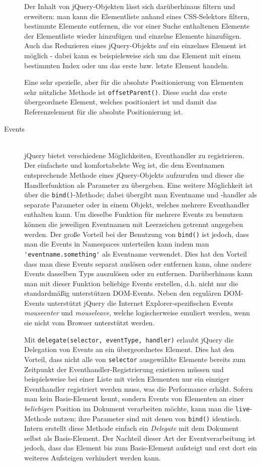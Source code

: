 \begin{description}
Der Inhalt von jQuery-Objekten lässt sich darüberhinaus filtern und erweitern: man kann die
Elementliste anhand eines CSS-Selektors filtern, bestimmte Elemente entfernen, die vor einer
Suche enthaltenen Elemente der Elementliste wieder hinzufügen und einzelne Elemente hinzufügen. Auch
das Reduzieren eines jQuery-Objekts auf ein einzelnes Element ist möglich - dabei kann es
beispielsweise sich um das Element mit einem bestimmten Index oder um das erste bzw. letzte Element
handeln.

Eine sehr spezielle, aber für die absolute Positionierung von Elementen sehr nützliche Methode ist
\lstinline{offsetParent()}. Diese sucht das erste übergeordnete Element, welches positioniert ist
und damit das Referenzelement für die absolute Positionierung ist.

\item[Events] \hfill \\
jQuery bietet verschiedene Möglichkeiten, Eventhandler zu registrieren. Der einfachste und
komfortabelste Weg ist, die dem Eventnamen entsprechende Methode eines jQuery-Objekts aufzurufen und
dieser die Handlerfunktion als Parameter zu übergeben. Eine weitere Möglichkeit ist über die
\lstinline{bind()}-Methode; dabei übergibt man Eventname und -handler als separate Parameter oder in
einem Objekt, welches mehrere Eventhandler enthalten kann. Um dieselbe Funktion für mehrere Events
zu benutzen können die jeweiligen Eventnamen mit Leerzeichen getrennt angegeben werden. Der große
Vorteil bei der Benutzung von \lstinline{bind()} ist jedoch, dass man die Events in Namespaces
unterteilen kann indem man \lstinline{'eventname.something'} als Eventname verwendet. Dies hat den
Vorteil dass man diese Events separat auslösen oder entfernen kann, ohne andere Events dasselben
Typs auszulösen oder zu entfernen. Darüberhinaus kann man mit dieser Funktion beliebige Events
erstellen, d.h. nicht nur die standardmäßig unterstützen DOM-Events. Neben den regulären DOM-Events
unterstützt jQuery die Internet Explorer-spezifischen Events \emph{mouseenter} und
\emph{mouseleave}, welche logischerweise emuliert werden, wenn sie nicht vom Browser unterstützt
werden.

Mit \lstinline{delegate(selector, eventType, handler)} erlaubt jQuery die Delegation von Events an
ein übergeordnetes Element. Dies hat den Vorteil, dass nicht alle von \lstinline{selector}
ausgewählte Elemente bereits zum Zeitpunkt der Eventhandler-Registrierung existieren müssen und
beispielsweise bei einer Liste mit vielen Elementen nur ein einziger Eventhandler registriert werden
muss, was die Performance erhöht. Sofern man kein Basis-Element kennt, sondern Events von Elementen
an einer \emph{beliebigen} Position im Dokument verarbeiten möchte, kann man die
\lstinline{live}-Methode nutzen; ihre Parameter sind mit denen von \lstinline{bind()} identisch.
Intern erstellt diese Methode einfach ein \emph{Delegate} mit dem Dokument selbst als Basis-Element.
Der Nachteil dieser Art der Eventverarbeitung ist jedoch, dass das Element bis zum Basis-Element
aufsteigt und erst dort ein weiteres Aufsteigen verhindert werden kann.


\end{description}
